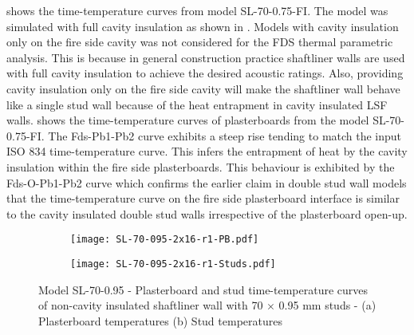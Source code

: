  shows the time-temperature curves from model SL-70-0.75-FI. The model was simulated with full cavity insulation as shown in . Models with cavity insulation only on the fire side cavity was not considered for the FDS thermal parametric analysis. This is because in general construction practice shaftliner walls are used with full cavity insulation to achieve the desired acoustic ratings. Also, providing cavity insulation only on the fire side cavity will make the shaftliner wall behave like a single stud wall because of the heat entrapment in cavity insulated LSF walls.  shows the time-temperature curves of plasterboards from the model SL-70-0.75-FI. The Fds-Pb1-Pb2 curve exhibits a steep rise tending to match the input ISO 834 time-temperature curve. This infers the entrapment of heat by the cavity insulation within the fire side plasterboards. This behaviour is exhibited by the Fds-O-Pb1-Pb2 curve which confirms the earlier claim in double stud wall models that the time-temperature curve on the fire side plasterboard interface is similar to the cavity insulated double stud walls irrespective of the plasterboard open-up. 
\begin{figure}[!htbp]
	\centering
	\begin{subfigure}[b]{0.6\textwidth}
		\centering
		\texttt{[image: SL-70-095-2x16-r1-PB.pdf]}
		\caption{}
		\label{subfig:SL-70-095-2x16-r1-PB}
	\end{subfigure}
	\begin{subfigure}[b]{0.6\textwidth}
		\centering
		\texttt{[image: SL-70-095-2x16-r1-Studs.pdf]}
		\caption{}
		\label{subfig:SL-70-095-2x16-r1-Studs}
	\end{subfigure}
	   \caption{Model SL-70-0.95 - Plasterboard and stud time-temperature curves of non-cavity insulated shaftliner wall with 70 $\times$ 0.95 mm studs - (a) Plasterboard temperatures (b) Stud temperatures}
	   \label{fig:SL-70-095-2x16-r1}
\end{figure}

